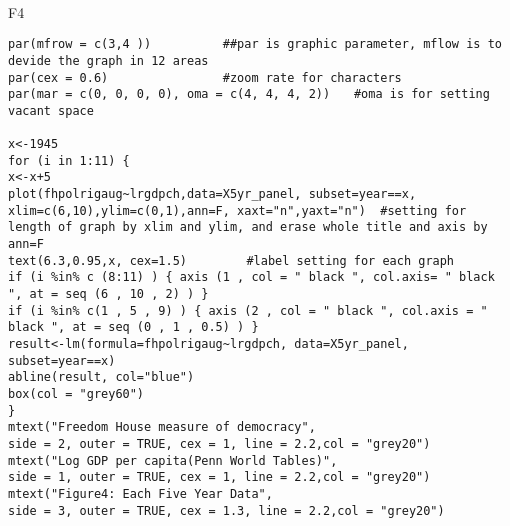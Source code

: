 \documentclass[a4paper,11pt]{article}
\begin{document}
\\
F4
\begin{lstlisting}
par(mfrow = c(3,4 ))          ##par is graphic parameter, mflow is to devide the graph in 12 areas
par(cex = 0.6)                #zoom rate for characters
par(mar = c(0, 0, 0, 0), oma = c(4, 4, 4, 2))　　#oma is for setting vacant space

x<-1945
for (i in 1:11) {
x<-x+5
plot(fhpolrigaug~lrgdpch,data=X5yr_panel, subset=year==x,
xlim=c(6,10),ylim=c(0,1),ann=F, xaxt="n",yaxt="n")  #setting for length of graph by xlim and ylim, and erase whole title and axis by ann=F
text(6.3,0.95,x, cex=1.5)　　　　　#label setting for each graph
if (i %in% c (8:11) ) { axis (1 , col = " black ", col.axis= " black ", at = seq (6 , 10 , 2) ) }
if (i %in% c(1 , 5 , 9) ) { axis (2 , col = " black ", col.axis = " black ", at = seq (0 , 1 , 0.5) ) }
result<-lm(formula=fhpolrigaug~lrgdpch, data=X5yr_panel, subset=year==x)
abline(result, col="blue")
box(col = "grey60")
}
mtext("Freedom House measure of democracy", 
side = 2, outer = TRUE, cex = 1, line = 2.2,col = "grey20")
mtext("Log GDP per capita(Penn World Tables)", 
side = 1, outer = TRUE, cex = 1, line = 2.2,col = "grey20")
mtext("Figure4: Each Five Year Data", 
side = 3, outer = TRUE, cex = 1.3, line = 2.2,col = "grey20")

\end{lstlisting}

\newpage


\newpage


\newpage






%
\end{document}

